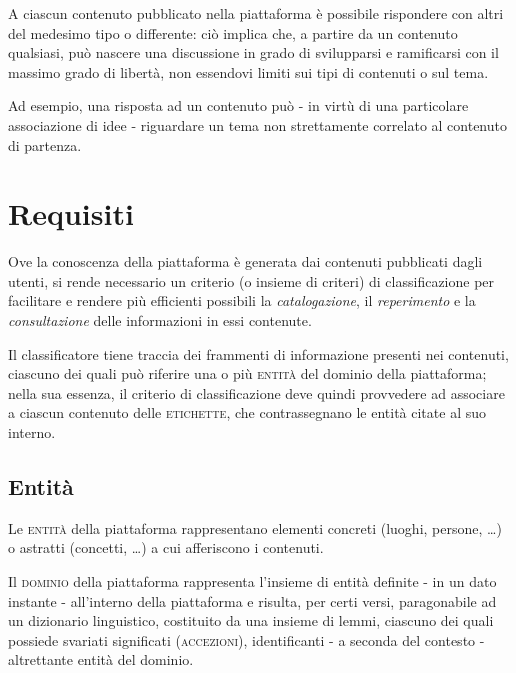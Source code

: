 \documentclass[10pt,a4paper,headinclude,footinclude,hidelinks]{scrreprt} %
\begin{document}

	A ciascun contenuto pubblicato nella piattaforma è possibile rispondere con altri del medesimo tipo o differente: ciò implica che, a partire da un contenuto qualsiasi, può nascere una discussione in grado di svilupparsi e ramificarsi con il massimo grado di libertà, non essendovi limiti sui tipi di contenuti o sul tema.

	Ad esempio, una risposta ad un contenuto può - in virtù di una particolare associazione di idee - riguardare un tema non strettamente correlato al contenuto di partenza.
	
	\chapter{Requisiti}
	\label{ch:stage:requisiti}
	Ove la conoscenza della piattaforma è generata dai contenuti pubblicati dagli utenti, si rende necessario un criterio (o insieme di criteri) di classificazione per facilitare e rendere più efficienti possibili la \textit{catalogazione}, il \textit{reperimento} e la \textit{consultazione} delle informazioni in essi contenute.

	Il classificatore tiene traccia dei frammenti di informazione presenti nei contenuti, ciascuno dei quali può riferire una o più \textsc{entità} del dominio della piattaforma; nella sua essenza, il criterio di classificazione deve quindi provvedere ad associare a ciascun contenuto delle \textsc{etichette}, che contrassegnano le entità citate al suo interno.

	\section{Entit\`a}
	\label{sec:stage:requisiti:entità}
	Le \textsc{entità} della piattaforma rappresentano elementi concreti (luoghi, persone, \ldots) o astratti (concetti, \ldots) a cui afferiscono i contenuti.

	Il \textsc{dominio} della piattaforma rappresenta l'insieme di entità definite - in un dato instante - all'interno della piattaforma e risulta, per certi versi, paragonabile ad un dizionario linguistico, costituito da una insieme di lemmi, ciascuno dei quali possiede svariati significati (\textsc{accezioni}), identificanti - a seconda del contesto - altrettante entità del dominio.
\end{document}
